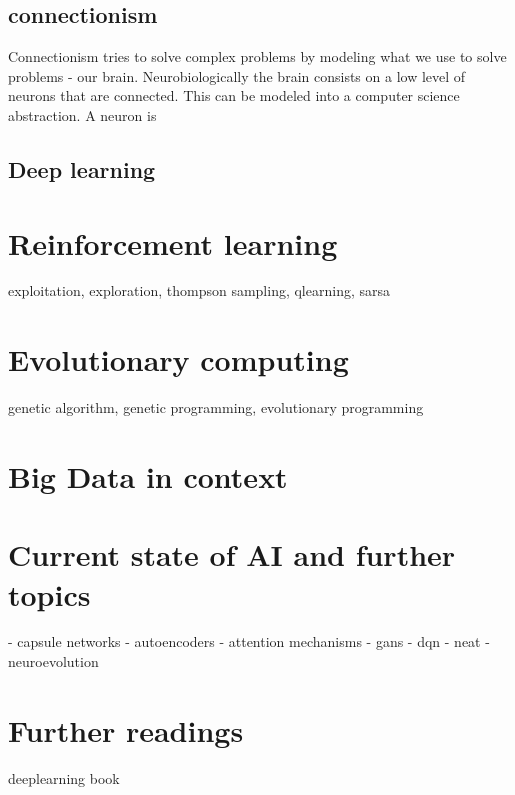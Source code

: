 \documentclass[jou,apacite]{apa6}
\begin{document}
\subsection{\gls{connectionism}}
Connectionism tries to solve complex problems by modeling what we use to solve problems - our brain. Neurobiologically the brain consists on a low level of neurons that are connected. This can be modeled into a computer science abstraction. A neuron is 

\subsection{Deep learning}

\section{Reinforcement learning}
exploitation, exploration, thompson sampling, qlearning, sarsa

\section{Evolutionary computing}
genetic algorithm, genetic programming, evolutionary programming

\section{Big Data in context}

\section{Current state of AI and further topics}
 - capsule networks
 - autoencoders
 - attention mechanisms
 - gans
 - dqn
 - neat
 - neuroevolution

\section{Further readings}
deeplearning book

\printglossaries
\printindex

\end{document}
